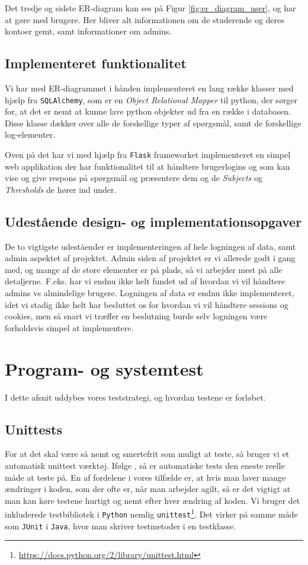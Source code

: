 \documentclass[11pt, a4paper]{article}
\begin{document}
Det tredje og sidste ER-diagram kan ses på Figur \ref{fig:er_diagram_user}, og har at gøre med brugere. Her bliver alt informationen om de studerende og deres kontoer gemt, samt informationer om admins.

\subsection{Implementeret funktionalitet}
\label{sub:implementeret_funktionalitet}
Vi har med ER-diagrammet i hånden implementeret en lang række klasser med hjælp fra \verb!SQLAlchemy!, som er en \emph{Object Relational Mapper} til python, der sørger for, at det er nemt at kunne lave python objekter ud fra en række i databasen. Disse klasse dækker over alle de forskellige typer af spørgsmål, samt de forskellige log-elementer.

Oven på det har vi med hjælp fra \verb!Flask! frameworket implementeret en simpel web applikation der har funktionalitet til at håndtere brugerlogins og som kan vise og give respons på spørgsmål og præsentere dem og de \emph{Subjects} og \emph{Thresholds} de hører ind under.

\subsection{Udestående design- og implementationsopgaver}
\label{sub:udestaende_design_og_implementationsopgaver}
De to vigtigste udeståender er implementeringen af hele logningen af data, samt admin aspektet af projektet.
Admin siden af projektet er vi allerede godt i gang med, og mange af de store elementer er på plads, så vi arbejder mest på alle detaljerne. F.eks. har vi endnu ikke helt fundet ud af hvordan vi vil håndtere admins vs almindelige brugere.
Logningen af data er endnu ikke implementeret, idet vi stadig ikke helt har besluttet os for hvordan vi vil håndtere sessions og cookies, men så snart vi træffer en beslutning burde selv logningen være forholdsvis simpel at implementere. 

\section{Program- og systemtest}
\label{sec:program_og_systemtest}
I dette afsnit uddybes vores teststrategi, og hvordan testene er forløbet.
\subsection{Unittests}
\label{sub:unittests}
For at det skal være så nemt og smertefrit som muligt at teste, så bruger vi et automatisk unittest værktøj. Ifølge \cite{COCO}, så er automatiske tests den eneste reelle måde at teste på. En af fordelene i vores tilfælde er, at hvis man laver mange ændringer i koden, som der ofte er, når man arbejder agilt, så er det vigtigt at man kan køre testene hurtigt og nemt efter hver ændring af koden. Vi bruger det inkluderede testbibliotek i \verb!Python! nemlig \verb!unittest!\footnote{\url{https://docs.python.org/2/library/unittest.html}}. Det virker på samme måde som \verb!JUnit! i \verb!Java!, hvor man skriver testmetoder i en testklasse.
\end{document}
